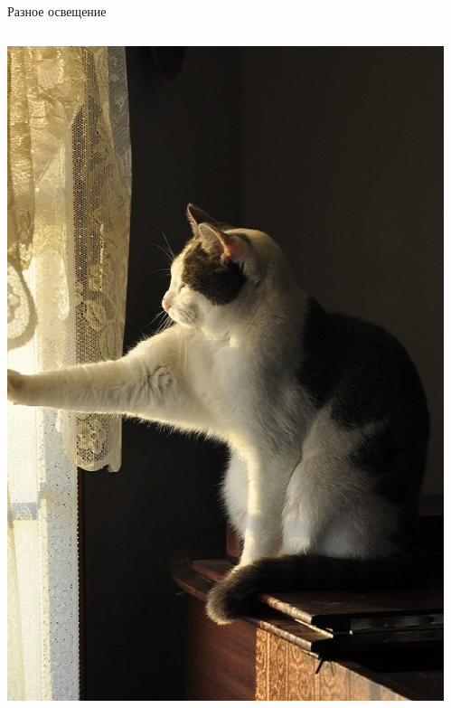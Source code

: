\documentclass[aspectratio=169, professionalfonts]{beamer}
\begin{document}
\begin{frame}{Разное освещение}
    \begin{columns}
        \begin{column}{.25\linewidth}
            \centering
            \includegraphics[width=\linewidth]{figures/fig19-cat.jpg}
        \end{column}
        \begin{column}{.25\linewidth}
            \centering

\end{column}
\end{columns}
\end{frame}
\end{document}
